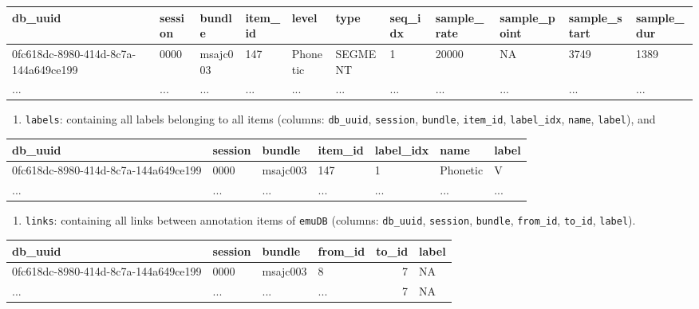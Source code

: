 \documentclass[]{book}
\providecommand{\tightlist}{%
  \setlength{\itemsep}{0pt}\setlength{\parskip}{0pt}}
\begin{document}
\begin{tabular}{l|l|l|l|l|l|l|l|l|l|l}
\hline
db\_uuid & session & bundle & item\_id & level & type & seq\_idx & sample\_rate & sample\_point & sample\_start & sample\_dur\\
\hline
0fc618dc-8980-414d-8c7a-144a649ce199 & 0000 & msajc003 & 147 & Phonetic & SEGMENT & 1 & 20000 & NA & 3749 & 1389\\
\hline
... & ... & ... & ... & ... & ... & ... & ... & ... & ... & ...\\
\hline
\end{tabular}

\begin{enumerate}
\def\labelenumi{\arabic{enumi}.}
\setcounter{enumi}{4}
\tightlist
\item
  \texttt{labels}: containing all labels belonging to all items (columns: \texttt{db\_uuid}, \texttt{session}, \texttt{bundle}, \texttt{item\_id}, \texttt{label\_idx}, \texttt{name}, \texttt{label}), and
\end{enumerate}

\begin{tabular}{l|l|l|l|l|l|l}
\hline
db\_uuid & session & bundle & item\_id & label\_idx & name & label\\
\hline
0fc618dc-8980-414d-8c7a-144a649ce199 & 0000 & msajc003 & 147 & 1 & Phonetic & V\\
\hline
... & ... & ... & ... & ... & ... & ...\\
\hline
\end{tabular}

\begin{enumerate}
\def\labelenumi{\arabic{enumi}.}
\setcounter{enumi}{5}
\tightlist
\item
  \texttt{links}: containing all links between annotation items of \texttt{emuDB} (columns: \texttt{db\_uuid}, \texttt{session}, \texttt{bundle}, \texttt{from\_id}, \texttt{to\_id}, \texttt{label}).
\end{enumerate}

\begin{tabular}{l|l|l|l|r|l}
\hline
db\_uuid & session & bundle & from\_id & to\_id & label\\
\hline
0fc618dc-8980-414d-8c7a-144a649ce199 & 0000 & msajc003 & 8 & 7 & NA\\
\hline
... & ... & ... & ... & 7 & NA\\
\hline
\end{tabular}
\end{document}
